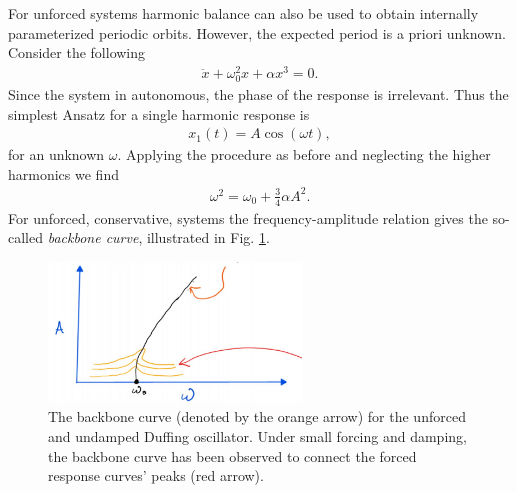 \begin{ex}
	For unforced systems harmonic balance can also be used to obtain internally parameterized periodic orbits. However, the expected period is a priori unknown. Consider the following
	\begin{align}
		 \ddot{x} + \omega _0^2 x + \alpha x^3 = 0.
	\end{align}
	Since the system in autonomous, the phase of the response is irrelevant. Thus the simplest Ansatz for a single harmonic response is
	\begin{align}
		x_1(t) = A \cos (\omega t),
	\end{align}
	for an unknown $\omega $. Applying the procedure as before and neglecting the higher harmonics we find
	\begin{align}
		\omega^2 = \omega_0 + \frac{3}{4} \alpha A^2.
	\end{align}
	For unforced, conservative, systems the frequency-amplitude relation gives the so-called \emph{backbone curve}, illustrated in Fig. \ref{fig:backbone}.
\begin{figure}[h!]
	\centering
	\includegraphics[width=0.6\textwidth]{figures/ch5/13backbone.png}
	\caption{The backbone curve (denoted by the orange arrow) for the unforced and undamped Duffing oscillator. Under small forcing and damping, the backbone curve has been observed to connect the forced response curves' peaks (red arrow).}
	\label{fig:backbone}
\end{figure}
\end{ex}
